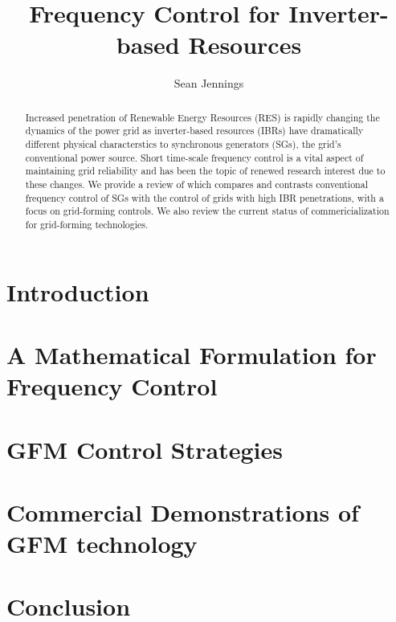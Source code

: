 \documentclass[journal]{IEEEtran}
\begin{document}
\author{Sean Jennings}
\title{Frequency Control for Inverter-based Resources}
\maketitle

\begin{abstract}
    Increased penetration of Renewable Energy Resources (RES) is rapidly changing
    the dynamics of the power grid as inverter-based resources (IBRs) have dramatically
    different physical characterstics to synchronous generators (SGs), the grid's
    conventional power source.
    Short time-scale frequency control is a vital aspect of maintaining grid
    reliability and has been the topic of renewed research interest due to these
    changes. We provide a review of which compares and contrasts conventional
    frequency control of SGs with the control of grids with high IBR
    penetrations, with a focus on grid-forming controls. We also review
    the current status of commericialization for grid-forming technologies.
\end{abstract}

\section{Introduction}

\section{A Mathematical Formulation for Frequency Control}

\section{GFM Control Strategies}

\section{Commercial Demonstrations of GFM technology}

\section{Conclusion}




\end{document}
